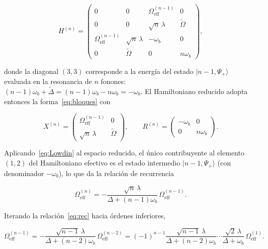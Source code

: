 \begin{equation}
	H^{(n)} = \begin{pmatrix}
		0 & 0 & \Omega_\mathrm{eff}^{(n-1)} & 0 \\[4pt]
		0 & 0 & \sqrt{n}\,\lambda & \widetilde\Omega \\[4pt]
		\Omega_\mathrm{eff}^{(n-1)} & \sqrt{n}\,\lambda & -\omega_b & 0 \\[4pt]
		0 & \widetilde\Omega & 0 & n\omega_b
	\end{pmatrix},
	\label{eq:Hn}
\end{equation}

donde la diagonal $(3,3)$ corresponde a la energía del estado $|n-1,\Psi_+\rangle$ evaluada en la resonancia de $n$ fonones: $(n-1)\omega_b + \widetilde\Delta = (n-1)\omega_b - n\omega_b = -\omega_b$. El Hamiltoniano reducido adopta entonces la forma~\eqref{eq:bloques} con

\begin{equation}
	X^{(n)} = \begin{pmatrix}
		\Omega_\mathrm{eff}^{(n-1)} & 0 \\[4pt]
		\sqrt{n}\,\lambda & \widetilde\Omega
	\end{pmatrix},
	\qquad
	R^{(n)} = \begin{pmatrix}
		-\omega_b & 0 \\[4pt]
		0 & n\omega_b
	\end{pmatrix}.
	\label{eq:XnRn}
\end{equation}

Aplicando~\eqref{eq:Lowdin} al espacio reducido, el único contribuyente al elemento $(1,2)$ del Hamiltoniano efectivo es el estado intermedio $|n-1,\Psi_+\rangle$ (con denominador $-\omega_b$), lo que da la relación de recurrencia

\begin{equation}
	\Omega_\mathrm{eff}^{(n)}
	= -\frac{\sqrt{n}\,\lambda}{\Delta+(n-1)\omega_b}\,
	\Omega_\mathrm{eff}^{(n-1)}.
	\label{eq:rec}
\end{equation}

Iterando la relación~\eqref{eq:rec} hacia órdenes inferiores,

\begin{equation}
	\Omega_\mathrm{eff}^{(n-1)}
	= -\frac{\sqrt{n-1}\,\lambda}{\Delta+(n-2)\omega_b}\,
	\Omega_\mathrm{eff}^{(n-2)}
	= (-1)^{n-1}
	\frac{\sqrt{n-1}\,\lambda}{\Delta+(n-2)\omega_b}\cdots
	\frac{\sqrt{2}\,\lambda}{\Delta+\omega_b}\,
	\Omega_\mathrm{eff}^{(1)}.
	\label{eq:chain}
\end{equation}

